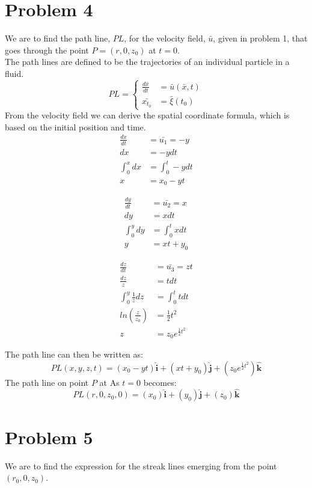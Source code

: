 \documentclass[11pt,a4paper,english]{article}
\numberwithin{equation}{section}
\let\oldhat\hat
\renewcommand{\hat}[1]{\mathbf{\oldhat{#1}}}
\begin{document}
\section{Problem 4}
We are to find the path line, $PL$, for the velocity field, $\bar{u}$, given in problem 1, that goes through the point $P = (r, 0, z_{0})$ at $t=0$.
\\
The path lines are defined to be the trajectories of an individual particle in a fluid.
\[ PL = 
\begin{cases} 
   \frac{d\bar{x}}{dt} &= \bar{u}(\bar{x}, t)	\\
   \bar{x_{t_0}} &= \bar{\xi}(t_{0})
\end{cases} 
\]
From the velocity field we can derive the spatial coordinate formula, which is based on the initial position and time.
\begin{align*}
	\frac{dx}{dt} &= \bar{u_1} = -y 	\\	
	dx &= -ydt						\\
	\int_0^x dx &= \int_0^t -ydt	\\
	x &= x_0 - yt
\end{align*}

\begin{align*}
	\frac{dy}{dt} &= \bar{u_2} = x 	\\	
	dy &= xdt						\\
	\int_0^y dy &= \int_0^t xdt	\\
	y &= xt + y_0
\end{align*}

\begin{align*}
	\frac{dz}{dt} 			&= \bar{u_3} = zt 			\\	
	\frac{dz}{z} 			&= tdt						\\
	\int_0^y \frac{1}{z}dz 	&= \int_0^t tdt				\\
	ln(\frac{z}{z_0}) 		&= \frac{1}{2}t^2			\\
	z &= z_0 e^{\frac{1}{2}t^2}
\end{align*}

The path line can then be written as:
$$PL(x, y, z, t) = (x_0 - yt)\hat{i} + (xt+y_0)\hat{j} + (z_0 e^{\frac{1}{2}t^2})\hat{k}$$
The path line on point $P$ at As $t=0$ becomes:
$$PL(r, 0, z_0, 0) = (x_0)\hat{i} + (y_0)\hat{j} + (z_0)\hat{k}$$

\section{Problem 5}
We are to find the expression for the streak lines emerging from the point $(r_0, 0, z_0)$. \\
\end{document}
